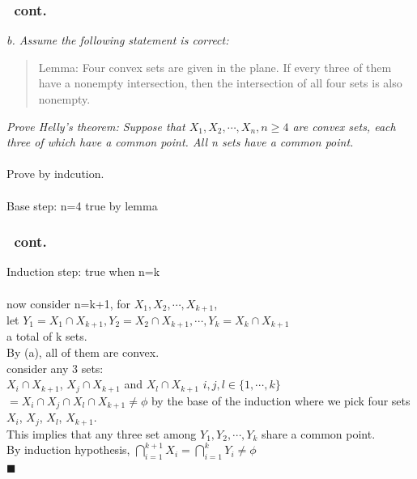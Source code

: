 \documentclass[a4paper,handout]{beamer}
\begin{document}
\begin{frame}[t]
  \frametitle{\subsecname\ cont.}
  \textit{b. Assume the following statement is correct:}\\ 
  \begin{quote} 
  Lemma: Four convex sets are given in the plane. If every three of them have a nonempty intersection, then the intersection of all four sets is also nonempty.
  \end{quote}
  \textit{Prove Helly's theorem: Suppose that $X_1, X_2, \cdots, X_n, n\geq4$ are convex sets, each three of which have a common point. All n sets have a common point.}\\ 
  $\;$\\
\alert{Prove by indcution.}\\ 
$\;$\\
Base step: n=4 true by lemma
\end{frame}

\begin{frame}[t]
  \frametitle{\subsecname\ cont.}
Induction step: true when n=k\\  $\;$\\
now consider n=k+1, for $X_1,X_2,\cdots,X_{k+1}$,\\ 
let $Y_1=X_1\cap X_{k+1},Y_2=X_2\cap X_{k+1},\cdots,Y_k=X_k\cap X_{k+1}$\\
\hfill a total of k sets.\\ 
By (a), all of them are convex. \\ 
consider any 3 sets:\\
$X_i \cap X_{k+1}$, $X_j \cap X_{k+1}$ and $X_l \cap X_{k+1}$ $i, j, l \in \{1,\cdots,k\} $ 
$=X_i \cap X_{j}\cap X_{l}\cap X_{k+1} \neq \phi$ by the base of the induction where we pick four sets $X_i$, $X_{j}$, $X_{l}$, $X_{k+1}$.\\ 
This implies that any three set among $Y_1, Y_2, \cdots, Y_k$ share a common point.\\ 
By induction hypothesis,
$\bigcap_{i=1}^{k+1}X_i=\bigcap_{i=1}^{k}Y_i\neq\phi$ \\
\hfill $\blacksquare$
\end{frame}
\end{document}
